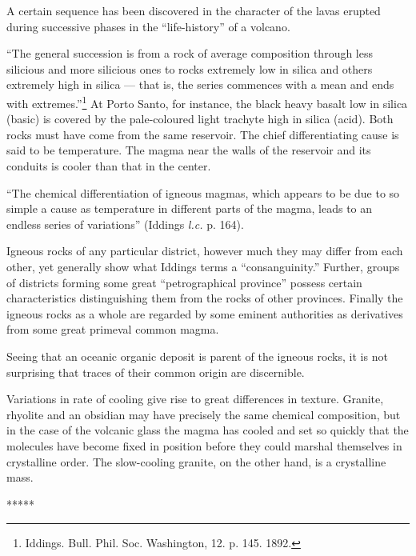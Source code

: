 \documentclass[a4paper, 12pt, oneside, landscape]{article}
\begin{document}
A certain sequence has been discovered in the character of the lavas erupted during successive phases in the ``life-history'' of a volcano.

``The general succession is from a rock of average composition through less silicious and more silicious ones to rocks extremely low in silica and others extremely high in silica --- that is, the series commences with a mean and ends with extremes.''\footnote{Iddings. Bull. Phil. Soc. Washington, 12. p. 145. 1892.} At Porto Santo, for instance, the black heavy basalt low in silica (basic) is covered by the pale-coloured light trachyte high in silica (acid). Both rocks must have come from the same reservoir. The chief differentiating cause is said to be temperature. The magma near the walls of the reservoir and its conduits is cooler than that in the center.

``The chemical differentiation of igneous magmas, which appears to be due to so simple a cause as temperature in different parts of the magma, leads to an endless series of variations'' (Iddings \emph{l.c.} p. 164).

Igneous rocks of any particular district, however much they may differ from each other, yet generally show what Iddings terms a ``consanguinity.'' Further, groups of districts forming some great ``petrographical province'' possess certain characteristics distinguishing them from the rocks of other provinces. Finally the igneous rocks as a whole are regarded by some eminent authorities as derivatives from some great primeval common magma.

Seeing that an oceanic organic deposit is parent of the igneous rocks, it is not surprising that traces of their common origin are discernible.

Variations in rate of cooling give rise to great differences in texture. Granite, rhyolite and an obsidian may have precisely the same chemical composition, but in the case of the volcanic glass the magma has cooled and set so quickly that the molecules have become fixed in position before they could marshal themselves in crystalline order. The slow-cooling granite, on the other hand, is a crystalline mass.

\centerline{*\hspace{15mm}*\hspace{15mm}*\hspace{15mm}*\hspace{15mm}*}
\bigskip
\end{document}
